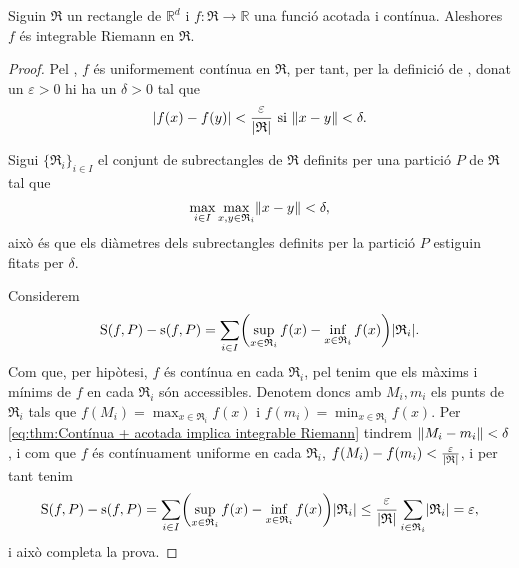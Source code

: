 \documentclass[../Apunts.tex]{subfiles}
\begin{document}
	\begin{theorem}
		\label{thm:Contínua + acotada implica integrable Riemann}
		Siguin \(\mathfrak{R}\) un rectangle de \(\mathbb{R}^{d}\) i \(f\colon\mathfrak{R}\to\mathbb{R}\) una funció acotada i contínua. Aleshores \(f\) és integrable Riemann en \(\mathfrak{R}\).
		\begin{proof}
			Pel , \(f\) és uniformement contínua en \(\mathfrak{R}\), per tant, per la definició de , donat un \(\varepsilon>0\) hi ha un \(\delta>0\) tal que
			\[\abs{f(x)-f(y)}<\frac{\varepsilon}{\abs{\mathfrak{R}}}\text{ si }\norm{x-y}<\delta.\]
			
			Sigui \(\{\mathfrak{R}_{i}\}_{i\in I}\) el conjunt de subrectangles de \(\mathfrak{R}\) definits per una partició \(P\) de \(\mathfrak{R}\) tal que
			\[\max_{i\in I}\max_{x,y\in \mathfrak{R}_{i}}\norm{x-y}<\delta,\]
			això és que els diàmetres dels subrectangles definits per la partició \(P\) estiguin fitats per \(\delta\).
			
			Considerem
			\begin{equation}\label{eq:thm:Contínua + acotada implica integrable Riemann}
			\Ssup(f,P)-\sinf(f,P)=\sum_{i\in I}\left(\sup_{x\in \mathfrak{R}_{i}}f(x)-\inf_{x\in \mathfrak{R}_{i}}f(x)\right)\abs{\mathfrak{R}_{i}}.
			\end{equation}
			Com que, per hipòtesi, \(f\) és contínua en cada \(\mathfrak{R}_{i}\), pel  tenim que els màxims i mínims de \(f\) en cada \(\mathfrak{R}_{i}\) són accessibles. Denotem doncs amb \(M_{i},m_{i}\) els punts de \(\mathfrak{R}_{i}\) tals que \(f(M_{i})=\max_{x\in \mathfrak{R}_{i}}f(x)\) i \(f(m_{i})=\min_{x\in \mathfrak{R}_{i}}f(x)\). Per \eqref{eq:thm:Contínua + acotada implica integrable Riemann} tindrem \(\norm{M_{i}-m_{i}}<\delta\), i com que \(f\) és contínuament uniforme en cada \(\mathfrak{R}_{i}\), \(f(M_{i})-f(m_{i})<\frac{\varepsilon}{\abs{\mathfrak{R}}}\), i per tant tenim
			\[\Ssup(f,P)-\sinf(f,P)=\sum_{i\in I}\left(\sup_{x\in \mathfrak{R}_{i}}f(x)-\inf_{x\in \mathfrak{R}_{i}}f(x)\right)\abs{\mathfrak{R}_{i}}\leq\frac{\varepsilon}{\abs{\mathfrak{R}}}\sum_{i\in \mathfrak{R}_{i}}\abs{\mathfrak{R}_{i}}=\varepsilon,\]
			i això completa la prova.
		\end{proof}
	\end{theorem}
\end{document}
